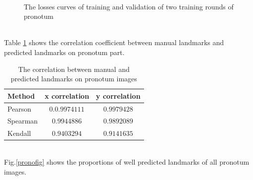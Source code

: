 \documentclass[12pt,a4paper]{article}
\begin{document}
\begin{figure}[h!]
\centering
{}~~
\caption{The losses curves of training and validation of two training rounds of pronotum}
\label{losspronotumcurves}
\end{figure}~\\
Table \ref{corrprono} shows the correlation coefficient between manual landmarks and predicted landmarks on pronotum part.
\begin{table}[h!]
	\centering
	\begin{tabular}{l c c}
		Method & x correlation & y correlation \\ \hline
		Pearson & $0.0.9974111$ & $0.9979428$ \\ \hline
		Spearman & $0.9944886$ & $0.9892089$ \\ \hline
		Kendall & $0.9403294$ & $0.9141635$ \\ \hline
	\end{tabular}
	\caption{The correlation between manual and predicted landmarks on pronotum images}
	\label{corrprono}
\end{table}~\\
Fig.\ref{pronofig} shows the proportions of well predicted landmarks of all pronotum images.
\end{document}
